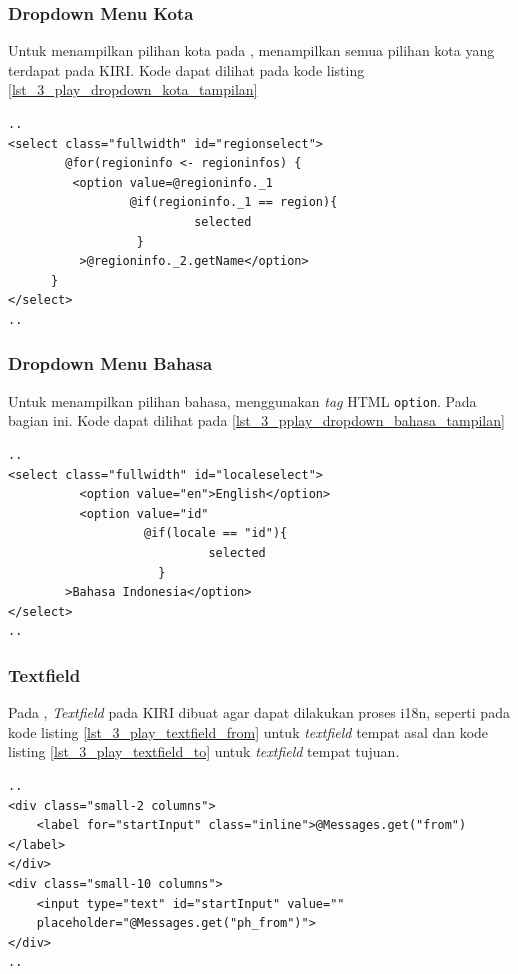 \subsubsection{Dropdown Menu Kota}
Untuk menampilkan pilihan kota pada \play, menampilkan semua pilihan kota yang terdapat pada KIRI. Kode dapat dilihat pada kode listing \ref{lst_3_play_dropdown_kota_tampilan}

\begin{lstlisting}[caption=Menampilkan pilihan kota kepada pengguna ,label = {lst_3_play_dropdown_kota_tampilan}]
..
<select class="fullwidth" id="regionselect">
    	@for(regioninfo <- regioninfos) {
         <option value=@regioninfo._1
                 @if(regioninfo._1 == region){
                          selected
                  }
          >@regioninfo._2.getName</option>
      }
</select>
..
\end{lstlisting}

\subsubsection{Dropdown Menu Bahasa}
Untuk menampilkan pilihan bahasa, menggunakan \textit{tag} HTML \verb!option!. Pada bagian ini. Kode dapat dilihat pada \ref{lst_3_pplay_dropdown_bahasa_tampilan}

\begin{lstlisting}[caption=Menampilkan pilihan bahasa kepada pengguna ,label = {lst_3_play_dropdown_bahasa_tampilan}]
..
<select class="fullwidth" id="localeselect">
          <option value="en">English</option>
          <option value="id"
                   @if(locale == "id"){
                            selected
                     }
        >Bahasa Indonesia</option>
</select>
..
\end{lstlisting}

\subsubsection{Textfield}
Pada \play, \textit{Textfield} pada KIRI dibuat  agar dapat dilakukan proses i18n, seperti pada kode listing \ref{lst_3_play_textfield_from} untuk \textit{textfield} tempat asal dan kode listing \ref{lst_3_play_textfield_to} untuk \textit{textfield} tempat tujuan.

\begin{lstlisting}[caption=Menampilkan \textit{textfield} tempat awal kepada pengguna ,label = {lst_3_play_textfield_from}]
..
<div class="small-2 columns">
    <label for="startInput" class="inline">@Messages.get("from")</label>
</div>
<div class="small-10 columns">
    <input type="text" id="startInput" value=""
    placeholder="@Messages.get("ph_from")">
</div>
..
\end{lstlisting}

